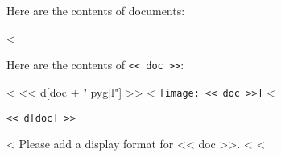 \documentclass[12pt]{article}
\begin{document}
Here are the contents of documents:

<%

Here are the contents of \verb|<< doc >>|:

<%
<< d[doc + "|pyg|l"] >>
<%
\texttt{[image: << doc >>]}
<%
\begin{Verbatim}
<< d[doc] >>
\end{Verbatim}
<%
Please add a display format for << doc >>.
<%
<%
\end{document}
